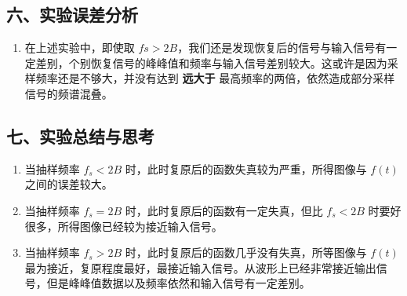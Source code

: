 \documentclass[dvipsnames, svgnames,a4paper,11pt]{article}
\begin{document}
\newpage
\subsection*{六、实验误差分析}
\begin{enumerate}
  \item 在上述实验中，即使取 $fs > 2B$，我们还是发现恢复后的信号与输入信号有一定差别，个别恢复信号的峰峰值和频率与输入信号差别较大。这或许是因为采样频率还是不够大，并没有达到 \textbf{远大于} 最高频率的两倍，依然造成部分采样信号的频谱混叠。
\end{enumerate}
\subsection*{七、实验总结与思考}
\begin{enumerate}
  \item 当抽样频率 $f_s < 2B$ 时，此时复原后的函数失真较为严重，所得图像与 $f(t)$ 之间的误差较大。
  \item 当抽样频率 $f_s = 2B$ 时，此时复原后的函数有一定失真，但比 $f_s < 2B$ 时要好很多，所得图像已经较为接近输入信号。
  \item 当抽样频率 $f_s > 2B$ 时，此时复原后的函数几乎没有失真，所等图像与 $f(t)$ 最为接近，复原程度最好，最接近输入信号。从波形上已经非常接近输出信号，但是峰峰值数据以及频率依然和输入信号有一定差别。
\end{enumerate}
\end{document}
